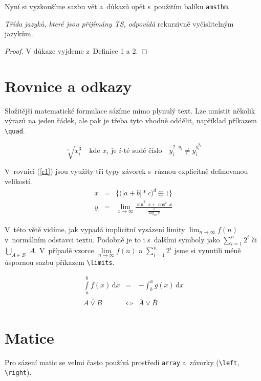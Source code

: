 \documentclass[a4paper, 11pt, twocolumn] {article}
\begin{document}
Nyní si vyzkoušíme sazbu vět a~důkazů opět s~použitím
balíku \texttt{amsthm}.


\begin{sentence}
\textit{Třída jazyků, které jsou přijímány TS, odpovídá}
rekurzivně vyčíslitelným jazykům.
\end{sentence}
\begin{proof} 
V důkaze vyjdeme z~Definice 1 a 2.
\end{proof}

\section{Rovnice a odkazy}
Složitější matematické formulace sázíme mimo plynulý
text. Lze umístit několik výrazů na jeden řádek, ale pak je
třeba tyto vhodně oddělit, například příkazem \verb!\quad!.

$$\sqrt[i]{x_i^3}\quad\text{kde } x_i \text{ je } i\text{-té } \text{sudé číslo}\quad y^{2\cdot y_i}_i \neq y_i^{y_i^{y_i}}$$

V~rovnici (\ref{r1}) jsou využity tři typy závorek s~různou
explicitně definovanou velikostí.
\begin{eqnarray}
\label{r1}
 x & = & \bigg\{\Big(\big[a+b\big]*c\Big)^d\oplus 1\bigg\}  \\ 
 y & = & \lim\limits_{x \to \infty}\frac{\sin^2\,{x} + \cos^2\,{x}}{\frac{1}{\log_{10}x}}  \nonumber
\end{eqnarray}

\par V~této větě vidíme, jak vypadá implicitní vysázení limity $\lim_{n \to \infty}{f(n)}$ v~normálním odstavci textu. Podobně je to i s~dalšími symboly jako $\sum_{i=1}^{n} 2^i$ či $\bigcup_{A \in \mathcal{B}}$ $A$. V~případě vzorce $\lim\limits_{n \to \infty}{f(n)}$ a $\sum\limits _{i=1}^n 2^i$ jsme si vynutili méně úspornou sazbu příkazem \verb!\limits!.

\begin{eqnarray}
\int\limits_a^b f(x)\,\mathrm{d}x & = & -\int_b^a g(x)\, \mathrm{d}x\\
\overline{\overline{A \vee B}} & \Leftrightarrow & \overline{\overline{A} \vee \overline{B}}
\end{eqnarray}

\section{Matice}
Pro sázení matic se velmi často používá prostředí \texttt{array} a~závorky (\verb|\left|, \verb!\right!).
\end{document}
